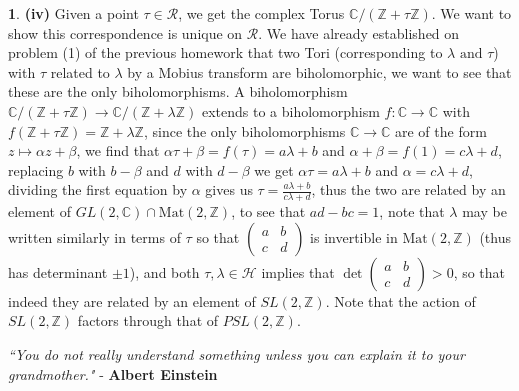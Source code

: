 \documentclass[10.5pt]{article}
\theoremstyle{definition}
\newtheorem{pb}{}
\newcommand{\tand}{\text{ and }}
\begin{document}
\begin{pb}
        \textbf{(iv)} Given a point \(\tau \in \mathcal{R}\), we get the complex Torus \(\mathbb{C}/(\mathbb{Z} + \tau \mathbb{Z})\). We want to show this correspondence is unique on \(\mathcal{R}\). We have already established on problem (1) of the previous homework that two Tori (corresponding to \(\lambda \tand \tau\)) with \(\tau\) related to \(\lambda\) by a Mobius transform are biholomorphic, we want to see that these are the only biholomorphisms. A biholomorphism \(\mathbb{C}/ (\mathbb{Z} + \tau \mathbb{Z}) \to \mathbb{C}/ (\mathbb{Z} + \lambda \mathbb{Z})\) extends to a biholomorphism \(f: \mathbb{C} \to \mathbb{C}\) with \(f(\mathbb{Z} + \tau \mathbb{Z}) = \mathbb{Z} + \lambda \mathbb{Z}\), since the only biholomorphisms \(\mathbb{C} \to \mathbb{C}\) are of the form \(z \mapsto \alpha z + \beta\), we find that \(\alpha \tau + \beta = f(\tau) = a \lambda + b\) and \(\alpha + \beta = f(1) = c \lambda + d\), replacing \(b\) with \(b - \beta\) and \(d\) with \(d - \beta\) we get \(\alpha \tau = a \lambda + b\) and \(\alpha = c \lambda + d\), dividing the first equation by \(\alpha\) gives us \(\tau = \frac{a \lambda + b}{c \lambda + d}\), thus the two are related by an element of \(GL(2,\mathbb{C}) \cap \text{Mat}(2,\mathbb{Z})\), to see that \(ad - bc = 1\), note that \(\lambda\) may be written similarly in terms of \(\tau\) so that \(\begin{pmatrix} a & b \\ c & d \end{pmatrix}\) is invertible in \(\text{Mat}(2,\mathbb{Z})\) (thus has determinant \(\pm 1\)), and both \(\tau, \lambda \in \mathcal{H}\) implies that \(\det\begin{pmatrix} a & b \\ c & d \end{pmatrix} > 0\), so that indeed they are related by an element of \(SL(2,\mathbb{Z})\). Note that the action of \(SL(2,\mathbb{Z})\) factors through that of \(PSL(2,\mathbb{Z})\).
    \end{pb}

    \emph{``You do not really understand something unless you can explain it to your grandmother."} - \textbf{Albert Einstein}
\end{document}
